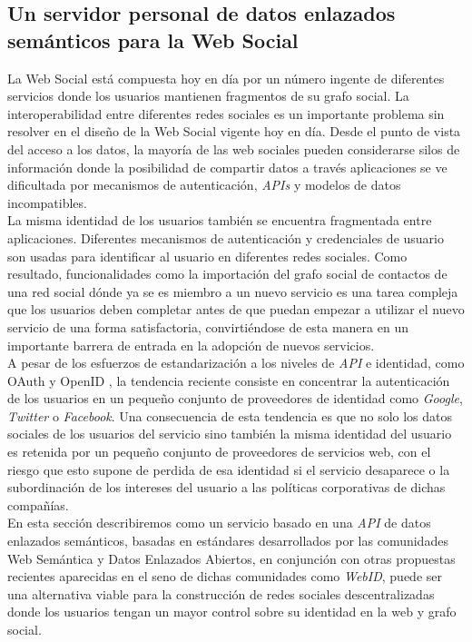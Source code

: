 \subsection{Un servidor personal de datos enlazados sem\'anticos para la Web Social}

La Web Social est\'a compuesta hoy en d\'ia por un n\'umero ingente de diferentes servicios donde los usuarios mantienen fragmentos de su grafo social. La interoperabilidad entre diferentes redes sociales es un importante problema sin resolver en el dise\~no de la Web Social vigente hoy en d\'ia. Desde el punto de vista del acceso a los datos, la mayor\'ia de las web sociales pueden considerarse silos de informaci\'on \cite{halpin2008beyond} donde la posibilidad de compartir datos a trav\'es aplicaciones se ve dificultada por mecanismos de autenticaci\'on, \textit{APIs}  y modelos de datos incompatibles.\\
La misma identidad de los usuarios tambi\'en se encuentra fragmentada entre aplicaciones. Diferentes mecanismos de autenticaci\'on y credenciales de usuario son usadas para identificar al usuario en diferentes redes sociales. Como resultado, funcionalidades como la importaci\'on del grafo social de contactos de una red social d\'onde ya se es miembro a un nuevo servicio es una tarea compleja que los usuarios deben completar antes de que puedan empezar a utilizar el nuevo servicio de una forma satisfactoria, convirti\'endose de esta manera en un importante barrera de entrada en la adopci\'on de nuevos servicios.\\
A pesar de los esfuerzos de estandarizaci\'on a los niveles de \textit{API}  e identidad, como OAuth \cite{hammer2010oauth} y OpenID \cite{openid}, la tendencia reciente consiste en concentrar la autenticaci\'on de los usuarios en un peque\~no conjunto de proveedores de identidad como \textit{Google}, \textit{Twitter} o \textit{Facebook}. Una consecuencia de esta tendencia es que no solo los datos sociales de los usuarios del servicio sino tambi\'en la misma identidad del usuario es retenida por un peque\~no conjunto de proveedores de servicios web, con el riesgo que esto supone de perdida de esa identidad si el servicio desaparece o la subordinaci\'on de los intereses del usuario a las pol\'iticas corporativas de dichas compa\~n\'ias.\\
En esta secci\'on describiremos como un servicio basado en una \textit{API} de datos enlazados sem\'anticos, basadas en est\'andares desarrollados por las comunidades Web Sem\'antica y Datos Enlazados Abiertos, en conjunci\'on con otras propuestas recientes aparecidas en el seno de dichas comunidades como \textit{WebID}, puede ser una alternativa viable para la construcci\'on de redes sociales descentralizadas donde los usuarios tengan un mayor control sobre su identidad en la web y grafo social.\\
